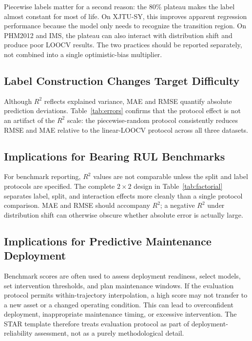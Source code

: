 \documentclass[pdflatex,sn-mathphys-num]{sn-jnl}
\begin{document}
Piecewise labels matter for a second reason: the 80\% plateau makes the label almost constant for most of life. On XJTU-SY, this improves apparent regression performance because the model only needs to recognize the transition region. On PHM2012 and IMS, the plateau can also interact with distribution shift and produce poor LOOCV results. The two practices should be reported separately, not combined into a single optimistic-bias multiplier.
\subsection{Label Construction Changes Target Difficulty}

Although $R^2$ reflects explained variance, MAE and RMSE quantify absolute prediction deviations. Table~\ref{tab:errors} confirms that the protocol effect is not an artifact of the $R^2$ scale: the piecewise-random protocol consistently reduces RMSE and MAE relative to the linear-LOOCV protocol across all three datasets.

\subsection{Implications for Bearing RUL Benchmarks}
For benchmark reporting, $R^2$ values are not comparable unless the split and label protocols are specified. The complete $2 \times 2$ design in Table~\ref{tab:factorial} separates label, split, and interaction effects more cleanly than a single protocol comparison. MAE and RMSE should accompany $R^2$; a negative $R^2$ under distribution shift can otherwise obscure whether absolute error is actually large.

\subsection{Implications for Predictive Maintenance Deployment}
Benchmark scores are often used to assess deployment readiness, select models, set intervention thresholds, and plan maintenance windows. If the evaluation protocol permits within-trajectory interpolation, a high score may not transfer to a new asset or a changed operating condition. This can lead to overconfident deployment, inappropriate maintenance timing, or excessive intervention. The STAR template therefore treats evaluation protocol as part of deployment-reliability assessment, not as a purely methodological detail.
\end{document}
